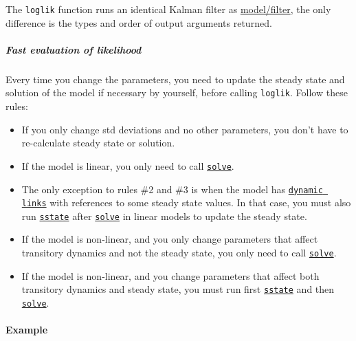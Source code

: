  The \texttt{loglik} function runs an identical Kalman filter as
 \url{model/filter}, the only difference is the types and order of output
 arguments returned.
 
 \subparagraph{Fast evaluation of likelihood}
 
 Every time you change the parameters, you need to update the steady
 state and solution of the model if necessary by yourself, before calling
 \texttt{loglik}. Follow these rules:
 
 \begin{itemize}
 \item
   If you only change std deviations and no other parameters, you don't
   have to re-calculate steady state or solution.
 \item
   If the model is linear, you only need to call
   \href{model/solve}{\texttt{solve}}.
 \item
   The only exception to rules \#2 and \#3 is when the model has
   \href{modellang/links}{\texttt{dynamic links}} with references to some
   steady state values. In that case, you must also run
   \href{model/sstate}{\texttt{sstate}} after
   \href{model/solve}{\texttt{solve}} in linear models to update the
   steady state.
 \item
   If the model is non-linear, and you only change parameters that affect
   transitory dynamics and not the steady state, you only need to call
   \href{model/solve}{\texttt{solve}}.
 \item
   If the model is non-linear, and you change parameters that affect both
   transitory dynamics and steady state, you must run first
   \href{model/sstate}{\texttt{sstate}} and then
   \href{model/solve}{\texttt{solve}}.
 \end{itemize}
 
 \paragraph{Example}


